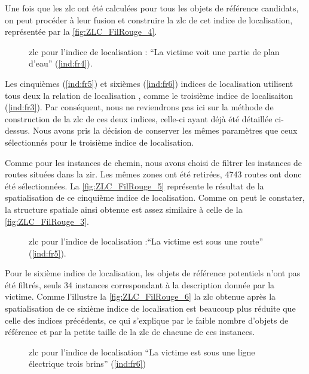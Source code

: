 Une fois que les \ac{zlc} ont été calculées pour tous les objets de
référence candidats, on peut procéder à leur fusion et construire la
\ac{zlc} de cet indice de localisation, représentée par la
\autoref{fig:ZLC_FilRouge_4}.

\begin{figure}
  \centering
  
  \caption{\ac{zlc} pour l'indice de localisation : \enquote{La
      victime voit une partie de plan d'eau} (\ref{ind:fr4}).}
  \label{fig:ZLC_FilRouge_4}
\end{figure}

Les cinquièmes (\ref{ind:fr5}) et sixièmes (\ref{ind:fr6}) indices de
localisation utilisent tous deux la relation de localisation
, comme le troisième indice de
localisaiton (\ref{ind:fr3}). Par conséquent, nous ne reviendrons pas
ici sur la méthode de construction de la \ac{zlc} de ces deux indices,
celle-ci ayant déjà été détaillée ci-dessus. Nous avons pris la
décision de conserver les mêmes paramètres que ceux sélectionnés pour
le troisième indice de localisation.

Comme pour les instances de chemin, nous avons choisi de filtrer les
instances de routes situées dans la \ac{zir}. Les mêmes zones ont été
retirées, \num{4743} routes ont donc été sélectionnées.
%
La \autoref{fig:ZLC_FilRouge_5} représente le résultat de la
spatialisation de ce cinquième indice de localisation. Comme on peut
le constater, la structure spatiale ainsi obtenue est assez similaire
à celle de la \autoref{fig:ZLC_FilRouge_3}.

\begin{figure}
  \centering
  
  \caption{\ac{zlc} pour l'indice de localisation :\enquote{La victime
      est sous une route} (\ref{ind:fr5}).}
  \label{fig:ZLC_FilRouge_5}
\end{figure}

Pour le sixième indice de localisation, les objets de référence
potentiels n'ont pas été filtrés, seuls 34 instances correspondant à
la description donnée par la victime.
%
Comme l'illustre la \autoref{fig:ZLC_FilRouge_6} la \ac{zlc} obtenue
après la spatialisation de ce sixième indice de localisation est
beaucoup plus réduite que celle des indices précédents, ce qui
s'explique par le faible nombre d'objets de référence et par la petite
taille de la \ac{zlc} de chacune de ces instances.

\begin{figure}
  \centering
  
  \caption{\ac{zlc} pour l'indice de localisation \enquote{La victime
      est sous une ligne électrique trois brins} (\ref{ind:fr6})}
  \label{fig:ZLC_FilRouge_6}
\end{figure}


